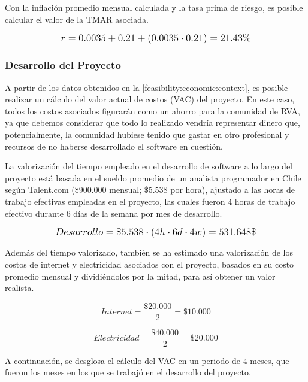Con la inflación promedio mensual calculada y la tasa prima de riesgo, es posible calcular el valor de la TMAR asociada.

\[
\mathlarger{
	r = 0.0035+0.21+(0.0035\cdot0.21) = 21.43\%
}
\]

\subsubsection{Desarrollo del Proyecto}
A partir de los datos obtenidos en la \autoref{feasibility:economic:context}, es posible realizar un cálculo del valor actual de costos (VAC) del proyecto. En este caso, todos los costos asociados figurarán como un ahorro para la comunidad de RVA, ya que debemos considerar que todo lo realizado vendría representar dinero que, potencialmente, la comunidad hubiese tenido que gastar en otro profesional y recursos de no haberse desarrollado el software en cuestión.

La valorización del tiempo empleado en el desarrollo de software a lo largo del proyecto está basada en el sueldo promedio de un analista programador en Chile según Talent.com (\$900.000 mensual; \$5.538 por hora), ajustado a las horas de trabajo efectivas empleadas en el proyecto, las cuales fueron 4 horas de trabajo efectivo durante 6 días de la semana por mes de desarrollo.

\[
\mathlarger{
	Desarrollo = \$5.538 \cdot \left(4h\cdot6d\cdot4w\right) = 531.648\$
}
\]

Además del tiempo valorizado, también se ha estimado una valorización de los costos de internet y electricidad asociados con el proyecto, basados en su costo promedio mensual y dividiéndolos por la mitad, para así obtener un valor realista.

\[
	Internet = \frac{\$20.000}{2} = \$10.000
\]

\[
	Electricidad = \frac{\$40.000}{2} = \$20.000
\]

A continuación, se desglosa el cálculo del VAC en un periodo de 4 meses, que fueron los meses en los que se trabajó en el desarrollo del proyecto.

